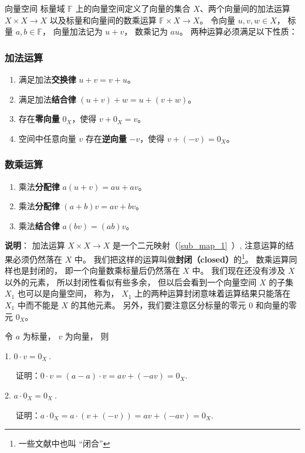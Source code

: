 \begin{definition}{向量空间}
标量域 $\mathbb F$ 上的向量空间定义了向量的集合 $X$、两个向量间的加法运算 $X\times X \to X$ 以及标量和向量间的数乘运算 $\mathbb F \times X \to X$。 令向量 $u,v,w \in X$， 标量 $a,b \in \mathbb F$， 向量加法记为 $u + v$， 数乘记为 $a u$。 两种运算必须满足以下性质：

\subsubsection{加法运算}
\begin{enumerate}
\item 满足加法\textbf{交换律} $u + v = v + u$。
\item 满足加法\textbf{结合律} $(u + v) + w = u + (v + w)$。
\item 存在\textbf{零向量} $0_X$，使得 $v + 0_X = v$。
\item 空间中任意向量 $v$ 存在\textbf{逆向量} $-v$，使得 $v + (-v) = 0_X$。
\end{enumerate}

\subsubsection{数乘运算}
\begin{enumerate}
\item 乘法\textbf{分配律} $a(u + v) = au + av$。
\item 乘法\textbf{分配律} $(a + b)v = av + bv$。
\item 乘法\textbf{结合律} $a (b v) = (ab) v$。
\end{enumerate}
\end{definition}

\textbf{说明}： 加法运算 $X \times X \to X$ 是一个二元映射（\autoref{sub_map_1}~）, 注意运算的结果必须仍然落在 $X$ 中。 我们把这样的运算叫做\textbf{封闭（closed）}的\footnote{一些文献中也叫 “闭合”}。 数乘运算同样也是封闭的， 即一个向量数乘标量后仍然落在 $X$ 中。 我们现在还没有涉及 $X$ 以外的元素， 所以封闭性看似有些多余， 但以后会看到一个向量空间 $X$ 的子集 $X_1$ 也可以是向量空间， 称为， $X_1$ 上的两种运算封闭意味着运算结果只能落在 $X_1$ 中而不能是 $X$ 的其他元素。 另外，我们要注意区分标量的零元 $0$ 和向量的零元 $0_X$。

\begin{corollary}{}
令 $a$ 为标量， $v$ 为向量， 则

1. $0\cdot v=0_X~.$

$\quad$ 证明：$0\cdot v=(a-a)\cdot v=av+(-av)=0_X$.

2. $a \cdot 0_X=0_X~.$

$\quad$ 证明：$a \cdot 0_X=a\cdot(v+(-v))=av+(-av)=0_X$.

\end{corollary}

